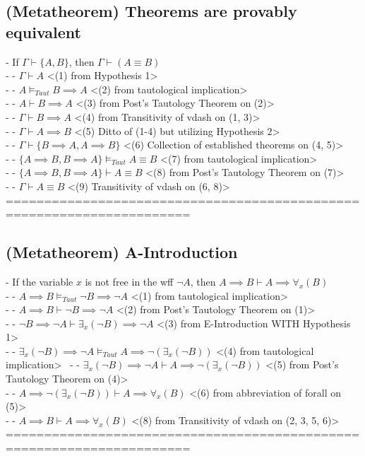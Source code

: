 \documentclass{article}
\begin{document}
\subsection{(Metatheorem) Theorems are provably equivalent}
	- If $\Gamma \vdash \{A, B\}$, then $\Gamma \vdash (A \equiv B)$ \\
		- - $\Gamma \vdash A$ <(1) from Hypothesis 1> \\
		- - $A \vDash_{Taut} B \implies A$ <(2) from tautological implication> \\
		- - $A \vdash B \implies A$ <(3) from Post's Tautology Theorem on (2)> \\
		- - $\Gamma \vdash B \implies A$ <(4) from Transitivity of vdash on (1, 3)> \\
		- - $\Gamma \vdash A \implies B$ <(5) Ditto of (1-4) but utilizing Hypothesis 2> \\
		- - $\Gamma \vdash \{B \implies A, A \implies B\}$ <(6) Collection of established theorems on (4, 5)> \\
		- - $\{A \implies B, B \implies A\} \vDash_{Taut} A \equiv B$ <(7) from tautological implication> \\
		- - $\{A \implies B, B \implies A\} \vdash A \equiv B$ <(8) from Post's Tautology Theorem on (7)> \\
		- - $\Gamma \vdash A \equiv B$ <(9) Transitivity of vdash on (6, 8)> \\
	======================================================================
\subsection{(Metatheorem) A-Introduction}
	- If the variable $x$ is not free in the wff $\lnot A$, then $A \implies B \vdash A \implies \forall_x(B)$ \\
		- - $A \implies B \vDash_{Taut} \lnot B \implies \lnot A$ <(1) from tautological implication> \\
		- - $A \implies B \vdash \lnot B \implies \lnot A$ <(2) from Post's Tautology Theorem on (1)> \\
		- - $\lnot B \implies \lnot A \vdash \exists_x(\lnot B) \implies \lnot A$ <(3) from E-Introduction WITH Hypothesis 1> \\
		- - $\exists_x(\lnot B) \implies \lnot A \vDash_{Taut} A \implies \lnot(\exists_x(\lnot B))$ <(4) from tautological implication> \
		- - $\exists_x(\lnot B) \implies \lnot A \vdash A \implies \lnot(\exists_x(\lnot B))$ <(5) from Post's Tautology Theorem on (4)> \\
		- - $A \implies \lnot(\exists_x(\lnot B))\vdash A \implies \forall_x(B)$ <(6) from abbreviation of forall on (5)> \\
		- - $A \implies B \vdash A \implies \forall_x(B)$ <(8) from Transitivity of vdash on (2, 3, 5, 6)> \\
	======================================================================
\end{document}

